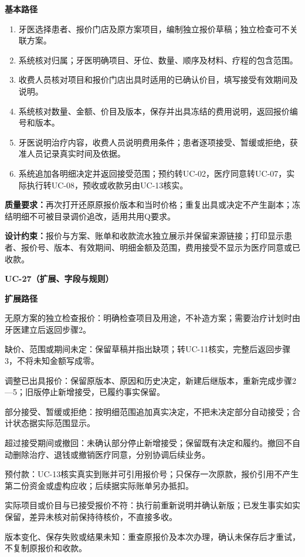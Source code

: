 \documentclass[UTF8,a4paper,zihao=-4,fontset=none]{ctexart}
\begin{document}
\smallskip\noindent\textbf{基本路径}\par
\begin{enumerate}\setlength{\itemsep}{0pt}\setlength{\parsep}{0pt}\setlength{\topsep}{2pt}
\item 牙医选择患者、报价门店及原方案项目，编制独立报价草稿；独立检查可不关联方案。
\item 系统核对归属；牙医明确项目、牙位、数量、顺序及材料、疗程的包含范围。
\item 收费人员核对项目和报价门店出具时适用的已确认价目，填写接受有效期间及说明。
\item 系统核对数量、金额、价目及版本，保存并出具冻结的费用说明，返回报价编号和版本。
\item 牙医说明治疗内容，收费人员说明费用条件；患者逐项接受、暂缓或拒绝，获准人员记录真实时间及依据。
\item 系统追加各明细决定并返回接受范围；预约转UC-02，医疗同意转UC-07，实际执行转UC-08，预收或收款另由UC-13核实。
\end{enumerate}
\noindent\textbf{质量要求：}再次打开还原原报价版本和当时价格；重复出具或决定不产生副本；冻结明细不可被目录调价追改，适用共用Q要求。\par
\noindent\textbf{设计约束：}报价与方案、账单和收款流水独立展示并保留来源链接；打印显示患者、报价号、版本、有效期间、明细金额及范围，费用接受不显示为医疗同意或已收款。\par
\endgroup
\clearpage
\begingroup\small\linespread{1.04}\selectfont
\noindent\textbf{UC-27（扩展、字段与规则）}\par
\noindent\textbf{扩展路径}\par
\begin{description}\setlength{\itemsep}{1pt}\setlength{\parsep}{0pt}
\item[2a] 无原方案的独立检查报价：明确检查项目及用途，不补造方案；需要治疗计划时由牙医建立后返回步骤2。
\item[3a] 缺价、范围或期间未定：保留草稿并指出缺项；转UC-11核实，完整后返回步骤3，不将未知金额写成零。
\item[4a] 调整已出具报价：保留原版本、原因和历史决定，新建后继版本，重新完成步骤2—5；旧版停止新增接受，已履约事实保留。
\item[5a] 部分接受、暂缓或拒绝：按明细范围追加真实决定，不把未决定部分自动接受；合计状态据实际范围显示。
\item[5b] 超过接受期间或撤回：未确认部分停止新增接受；保留既有决定和履约。撤回不自动删除治疗、退钱或撤销医疗同意，分别协调后续业务。
\item[6a] 预付款：UC-13核实真实到账并可引用报价号；只保存一次原款，报价引用不产生第二份资金或虚构应收；后续据实际账单另办抵扣。
\item[6b] 实际项目或价目与已接受报价不符：执行前重新说明并确认新版；已发生事实如实保留，差异未核对前保持待核价，不直接多收。
\item[4b] 版本变化、保存失败或结果未知：重查原报价及本次办理，确认未保存后才重试，不复制原报价和收款。
\end{description}
\end{document}
